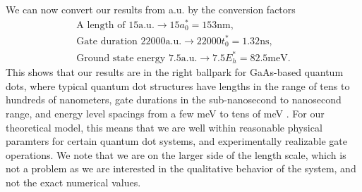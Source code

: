 \documentclass{subfiles}
\begin{document}
We can now convert our results from a.u. by the conversion factors
\begin{align*}
    \text{A length of }15\text{a.u.} \to 15 a_0^* = 153\text{nm}, \\
    \text{Gate duration }22000\text{a.u.} \to 22000 t_0^* = 1.32 \text{ns}, \\ 
    \text{Ground state energy }7.5\text{a.u.} \to 7.5 E_h^* = 82.5\text{meV}.
\end{align*}
This shows that our results are in the right ballpark for GaAs-based quantum dots, where typical quantum dot structures have lengths in the range of tens to hundreds of nanometers, gate durations in the sub-nanosecond to nanosecond range,  and energy level spacings from a few meV to tens of meV \cite{jacak2013quantum, garcia2021semiconductor}. For our theoretical model, this means that we are well within reasonable physical paramters for certain quantum dot systems, and experimentally realizable gate operations. We note that we are on the larger side of the length scale, which is not a problem as we are interested in the qualitative behavior of the system, and not the exact numerical values.
\end{document}
